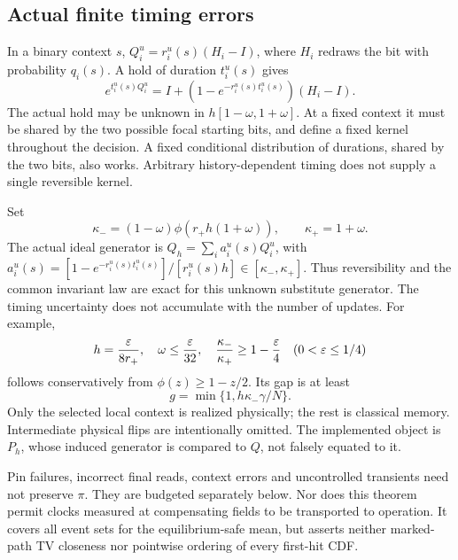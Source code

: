 \subsection{Actual finite timing errors}
In a binary context $s$, $Q_i^u=r_i^u(s)(H_i-I)$, where $H_i$ redraws the bit with probability $q_i(s)$. A hold of duration $t_i^u(s)$ gives
\begin{equation}
 e^{t_i^u(s)Q_i^u}=I+(1-e^{-r_i^u(s)t_i^u(s)})(H_i-I).
 \label{eq:localhold}
\end{equation}
The actual hold may be unknown in $h[1-\omega,1+\omega]$. At a fixed context it must be shared by the two possible focal starting bits, and define a fixed kernel throughout the decision. A fixed conditional distribution of durations, shared by the two bits, also works. Arbitrary history-dependent timing does not supply a single reversible kernel.

Set
\begin{equation}
 \kappa_-=(1-\omega)\phi(r_+h(1+\omega)),\qquad \kappa_+=1+\omega.
 \label{eq:kappa}
\end{equation}
The actual ideal generator is $Q_h=\sum_i a_i^u(s)Q_i^u$, with
$a_i^u(s)=[1-e^{-r_i^u(s)t_i^u(s)}]/[r_i^u(s)h]\in[\kappa_-,\kappa_+]$.
Thus reversibility and the common invariant law are exact for this unknown substitute generator. The timing uncertainty does not accumulate with the number of updates. For example,
\begin{equation}
 h=\frac{\varepsilon}{8r_+},\quad \omega\le\frac{\varepsilon}{32},\quad
 \frac{\kappa_-}{\kappa_+}\ge1-\frac{\varepsilon}4\quad(0<\varepsilon\le1/4)
 \label{eq:holdrecipe}
\end{equation}
follows conservatively from $\phi(z)\ge1-z/2$. Its gap is at least
\begin{equation}
 g=\min\{1,h\kappa_-\gamma/N\}.
 \label{eq:g}
\end{equation}
Only the selected local context is realized physically; the rest is classical memory. Intermediate physical flips are intentionally omitted. The implemented object is $P_h$, whose induced generator is compared to $Q$, not falsely equated to it.

Pin failures, incorrect final reads, context errors and uncontrolled transients need not preserve $\pi$. They are budgeted separately below. Nor does this theorem permit clocks measured at compensating fields to be transported to operation. It covers all event sets for the equilibrium-safe mean, but asserts neither marked-path TV closeness nor pointwise ordering of every first-hit CDF.
